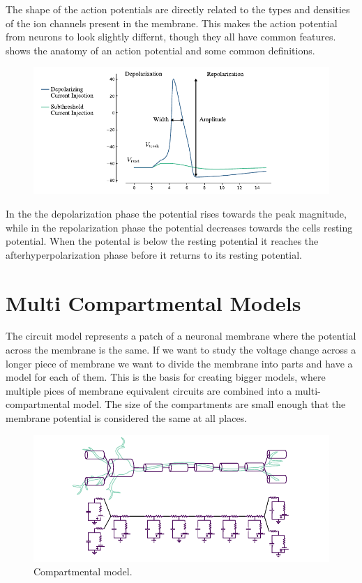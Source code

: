 \documentclass[altfont, fleqn]{uiophd}
\renewcommand{\Cref}[1]{{\color{viridis_03}\myCref{#1}}}
\begin{document}
The shape of the action potentials are directly 
related to the types and densities
of the ion channels present in the membrane. 
This makes the action potential from neurons to look slightly differnt, 
though they all have common features. 
\Cref{fig:2_action_potential_anatomy} shows the anatomy of an action potential and some common definitions. 
\begin{figure}[h]
    \centering
    \includegraphics[width=\textwidth]{images/sec_2/action_potential.pdf}
    \caption{
    }
    \label{fig:2_action_potential_anatomy}
\end{figure}

In the the depolarization phase the potential rises towards the peak magnitude, 
while in the repolarization phase the potential decreases towards
the cells resting potential.
When the potental is below the resting potential 
it reaches the afterhyperpolarization phase before
it returns to its resting potential.

\section{Multi Compartmental Models}
The circuit model represents a patch of a neuronal membrane
where the potential across the membrane is the same. 
If we want to study the voltage change across a longer piece of 
membrane we want to divide the membrane into parts and have a model for
each of them. 
This is the basis for creating bigger models, where multiple pices
of membrane equivalent circuits are combined into a multi-compartmental
model. 
The size of the compartments are small enough that the membrane potential is
considered the same at all places. 

\begin{figure}[h]
    \centering
    \includegraphics[width=1.0\textwidth]{images/2_1/compartments.pdf}
    \caption{Compartmental model.}
    \label{fig:2_comp_mod}
\end{figure}
\end{document}
